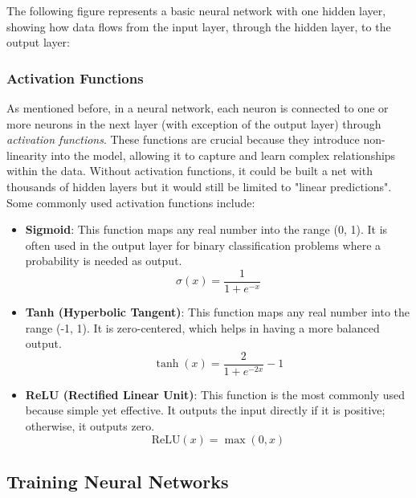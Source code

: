 \documentclass[../Thesis.tex]{subfiles}
\begin{document}
	The following figure represents a basic neural network with one hidden layer, showing how data flows from the input layer, through the hidden layer, to the output layer:
	
	
	\subsubsection{Activation Functions}

	As mentioned before, in a neural network, each neuron is connected to one or more neurons in the next layer (with exception of the output layer) through \emph{activation functions}. These functions are crucial because they introduce non-linearity into the model, allowing it to capture and learn complex relationships within the data. Without activation functions, it could be built a net with thousands of hidden layers but it would still be limited to "linear predictions". Some commonly used activation functions include:
	
	\begin{itemize}
		\item \textbf{Sigmoid}: This function maps any real number into the range (0, 1). It is often used in the output layer for binary classification problems where a probability is needed as output.
		\[
		\sigma(x) = \frac{1}{1 + e^{-x}}
		\]
		\item \textbf{Tanh (Hyperbolic Tangent)}: This function maps any real number into the range (-1, 1). It is zero-centered, which helps in having a more balanced output.
		\[
		\tanh(x) = \frac{2}{1 + e^{-2x}} - 1
		\]
		\item \textbf{ReLU (Rectified Linear Unit)}: This function is the most commonly used because simple yet effective. It outputs the input directly if it is positive; otherwise, it outputs zero.
		\[
		\text{ReLU}(x) = \max(0, x)
		\]
	\end{itemize}
	
\subsection{Training Neural Networks}
\end{document}
